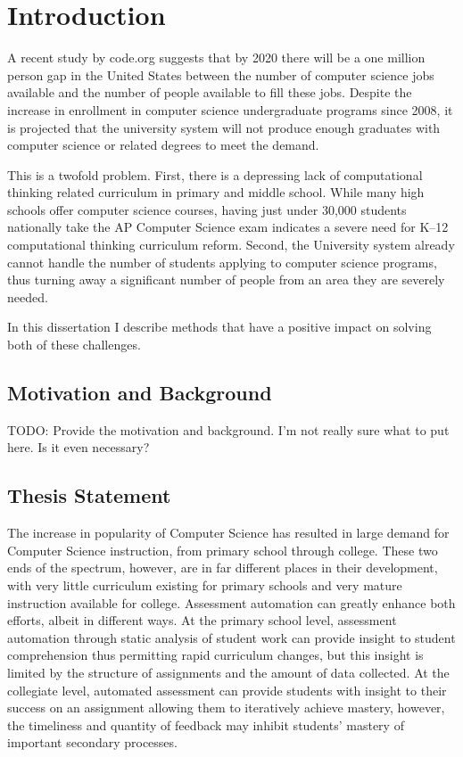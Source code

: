 \chapter{Introduction}
A recent study by code.org suggests that by 2020 there will be a one million
person gap in the United States between the number of computer science jobs
available and the number of people available to fill these jobs. Despite the
increase in enrollment in computer science undergraduate programs since 2008,
it is projected that the university system will not produce enough graduates
with computer science or related degrees to meet the demand.

This is a twofold problem. First, there is a depressing lack of computational
thinking related curriculum in primary and middle school. While many high
schools offer computer science courses, having just under 30,000 students
nationally take the AP Computer Science exam indicates a severe need for K--12
computational thinking curriculum reform. Second, the University system already
cannot handle the number of students applying to computer science programs,
thus turning away a significant number of people from an area they are severely
needed.

In this dissertation I describe methods that have a positive impact on solving
both of these challenges.


\section{Motivation and Background}
TODO: Provide the motivation and background. I'm not really sure what to put
here. Is it even necessary?

\section{Thesis Statement}
The increase in popularity of Computer Science has resulted in large demand for
Computer Science instruction, from primary school through college. These two
ends of the spectrum, however, are in far different places in their
development, with very little curriculum existing for primary schools and very
mature instruction available for college. Assessment automation can greatly
enhance both efforts, albeit in different ways. At the primary school level,
assessment automation through static analysis of student work can provide
insight to student comprehension thus permitting rapid curriculum changes, but
this insight is limited by the structure of assignments and the amount of data
collected. At the collegiate level, automated assessment can provide students
with insight to their success on an assignment allowing them to iteratively
achieve mastery, however, the timeliness and quantity of feedback may inhibit
students' mastery of important secondary processes.

